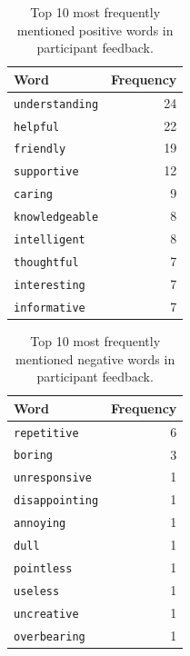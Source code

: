 \begin{table}[!htpb]
	\centering
	\begin{tabular}{lr}
		\toprule
		\textbf{Word}          & \textbf{Frequency} \\
		\midrule
		\texttt{understanding} & 24                 \\
		\texttt{helpful}       & 22                 \\
		\texttt{friendly}      & 19                 \\
		\texttt{supportive}    & 12                 \\
		\texttt{caring}        & 9                  \\
		\texttt{knowledgeable} & 8                  \\
		\texttt{intelligent}   & 8                  \\
		\texttt{thoughtful}    & 7                  \\
		\texttt{interesting}   & 7                  \\
		\texttt{informative}   & 7                  \\
		\bottomrule
	\end{tabular}
	\caption[Top 10 most frequently mentioned positive words in participant feedback]{Top 10 most frequently mentioned positive words in participant feedback.}
	\label{tab:top10pos}

\end{table}

\vspace{1em}

\begin{table}[!htpb]
	\centering
	\begin{tabular}{lr}
		\toprule
		\textbf{Word}          & \textbf{Frequency} \\
		\midrule
		\texttt{repetitive}    & 6                  \\
		\texttt{boring}        & 3                  \\
		\texttt{unresponsive}  & 1                  \\
		\texttt{disappointing} & 1                  \\
		\texttt{annoying}      & 1                  \\
		\texttt{dull}          & 1                  \\
		\texttt{pointless}     & 1                  \\
		\texttt{useless}       & 1                  \\
		\texttt{uncreative}    & 1                  \\
		\texttt{overbearing}   & 1                  \\
		\bottomrule
	\end{tabular}
	\caption[Top 10 most frequently mentioned negative words in participant feedback]{Top 10 most frequently mentioned negative words in participant feedback.}
	\label{tab:top10neg}

\end{table}



